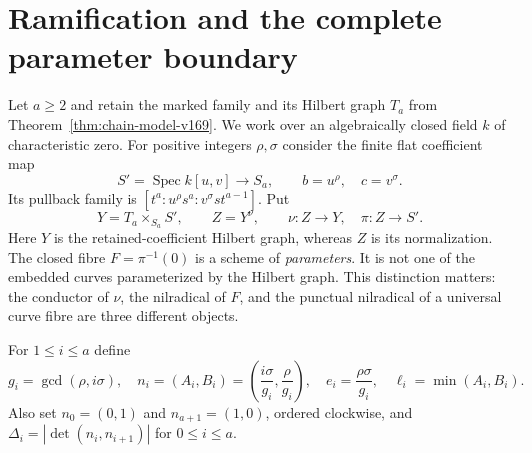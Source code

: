 \documentclass[11pt,reqno]{amsart}
\numberwithin{equation}{section}
\theoremstyle{definition}\newtheorem{definition}[theorem]{Definition}
\theoremstyle{remark}\newtheorem{remark}[theorem]{Remark}
\DeclareMathOperator{\Spec}{Spec}\DeclareMathOperator{\PGL}{PGL}
\begin{document}
\section{Ramification and the complete parameter boundary}
\label{sec:ramified-boundary-v170}
Let $a\geq2$ and retain the marked family and its Hilbert graph $T_a$
from Theorem~\ref{thm:chain-model-v169}. We work over an algebraically
closed field $k$ of characteristic zero. For positive integers
$\rho,\sigma$ consider the finite flat coefficient map
\[
 S'=\Spec k[u,v]\longrightarrow S_a,\qquad b=u^\rho,\quad c=v^\sigma.
\]
Its pullback family is $[t^a:u^\rho s^a:v^\sigma st^{a-1}]$. Put
\[
 Y=T_a\times_{S_a}S',\qquad Z=Y^\nu,\qquad
 \nu:Z\longrightarrow Y,\quad \pi:Z\longrightarrow S'.
\]
Here $Y$ is the retained-coefficient Hilbert graph, whereas $Z$ is its
normalization. The closed fibre $F=\pi^{-1}(0)$ is a scheme of
\emph{parameters}. It is not one of the embedded curves parameterized
by the Hilbert graph. This distinction matters: the conductor of
$\nu$, the nilradical of $F$, and the punctual nilradical of a universal
curve fibre are three different objects.

For $1\leq i\leq a$ define
\begin{equation}\label{eq:ramification-data-v170}
 g_i=\gcd(\rho,i\sigma),\quad
 n_i=(A_i,B_i)=\left(\frac{i\sigma}{g_i},\frac{\rho}{g_i}\right),
 \quad e_i=\frac{\rho\sigma}{g_i},\quad
 \ell_i=\min(A_i,B_i).
\end{equation}
Also set $n_0=(0,1)$ and $n_{a+1}=(1,0)$, ordered clockwise, and
$\Delta_i=|\det(n_i,n_{i+1})|$ for $0\leq i\leq a$.
\end{document}
